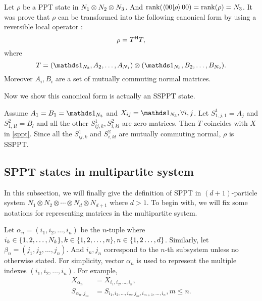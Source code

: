  \begin{example}
   Let  $\rho$ be a PPT state in $N_1\otimes N_2\linebreak\otimes N_3$. And  $\mathrm{rank} (\braket{00|\rho}{00})=\mathrm{rank} (\rho ) =
   N_3$. It was prove that $\rho$ can be transformed into the following canonical form  by using  a reversible local operator \cite{Wang2005a}:
   \begin{equation}
     \label{multiSPPTv0.6:eq:4}
     \rho = T^{\mathsf{H}} T,
   \end{equation}
   where
   \begin{equation}
     \label{multiSPPTv0.6:eq:5}
     T = (\I_{N_{3}}, A_2,\ldots,A_{N_1})\otimes (\I_{N_{3}},B_2,\ldots,B_{N_2}).
   \end{equation}
   Moreover $A_i,B_i$ are a set of mutually commuting normal matrices.
 \end{example}
 
   Now we show   this canonical form  is actually an  SSPPT  state.

   Assume $A_1 =B_1= \I _{N_3}$ and $X_{ij}=\I_{N_3},\forall i,j$.
   Let $S_{1,j,1}^1 = A_j$ and $S_{1,1l}^2 = B_l$ and  all the other $S_{ij,k}^1,S_{i,kl}^2$ are zero matrices. Then
   $T$ coincides with $X$ in \cref{sppt}.  Since all the $S_{ij,k}^1$ and $S_{i,kl}^2$ are mutually commuting normal, $\rho$ is  SSPPT.\@
   

   \subsection{SPPT states in multipartite system}\label{sec:sppt-multi-partite}


   In this subsection, we will finally give the definition of SPPT in $(d+1)$-particle  system
   $N_1\otimes N_2\otimes \cdots \otimes N_d\otimes N_{d+1} $ where $d>1$. 
    To begin with, we will fix some notations for representing
   matrices in the multipartite system.
   
   Let $\alpha_{n}=(i_1,i_2,\ldots,i_n)$ be the $n$-tuple where  $i_k\linebreak\in\{1,2,\ldots,N_k\},k \in\{ 1,2,\ldots,n\},n\in\{1,2\ldots,d\}$. Similarly, let
   $\beta_n = (j_1,j_2,\ldots,j_n)$. 
   And  $i_n,j_n$ correspond to the 
    $n$-th subsystem unless  no otherwise stated. For simplicity,   vector $\alpha_n$ is used to represent the multiple indexes $(i_1,i_2,\ldots,i_n)$. For example,
   \begin{equation}
     \label{eq:33}
     \begin{split}
       X_{\alpha_n} &= X_{i_1,i_2,\ldots,i_n},\\
       S_{\alpha_n,j_m}& = S_{i_1,i_2,\ldots,i_m,j_m,i_{m+1},\ldots,i_n},m\leqslant n.
     \end{split}
   \end{equation} 
   
